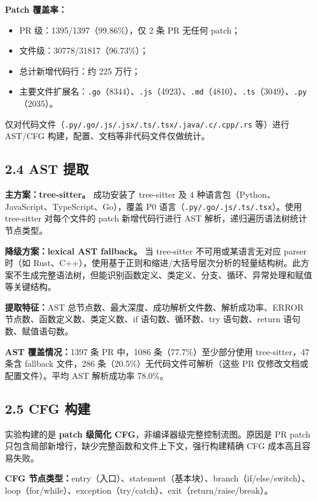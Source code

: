 \documentclass{experimentreport}
\begin{document}
{\textbf{Patch 覆盖率：}
\begin{itemize}
    \item PR 级：1395/1397（99.86\%），仅 2 条 PR 无任何 patch；
    \item 文件级：30778/31817（96.73\%）；
    \item 总计新增代码行：约 225 万行；
    \item 主要文件扩展名：\texttt{.go}（8344）、\texttt{.js}（4923）、\texttt{.md}（4810）、\texttt{.ts}（3049）、\texttt{.py}（2035）。
\end{itemize}

仅对代码文件（\texttt{.py/.go/.js/.jsx/.ts/.tsx/.java/.c/.cpp/.rs} 等）进行 AST/CFG 构建，配置、文档等非代码文件仅做统计。

\subsection*{2.4 AST 提取}

\textbf{主方案：tree-sitter。} 成功安装了 tree-sitter 及 4 种语言包（Python、JavaScript、TypeScript、Go），覆盖 P0 语言（\texttt{.py/.go/.js/.ts/.tsx}）。使用 tree-sitter 对每个文件的 patch 新增代码行进行 AST 解析，递归遍历语法树统计节点类型。

\textbf{降级方案：lexical AST fallback。} 当 tree-sitter 不可用或某语言无对应 parser 时（如 Rust、C++），使用基于正则和缩进/大括号层次分析的轻量结构树。此方案不生成完整语法树，但能识别函数定义、类定义、分支、循环、异常处理和赋值等关键结构。

\textbf{提取特征：}AST 总节点数、最大深度、成功解析文件数、解析成功率、ERROR 节点数、函数定义数、类定义数、if 语句数、循环数、try 语句数、return 语句数、赋值语句数。

\textbf{AST 覆盖情况：}1397 条 PR 中，1086 条（77.7\%）至少部分使用 tree-sitter，47 条含 fallback 文件，286 条（20.5\%）无代码文件可解析（这些 PR 仅修改文档或配置文件）。平均 AST 解析成功率 78.0\%。

\subsection*{2.5 CFG 构建}

实验构建的是 \textbf{patch 级简化 CFG}，非编译器级完整控制流图。原因是 PR patch 只包含局部新增行，缺少完整函数和文件上下文，强行构建精确 CFG 成本高且容易失败。

\textbf{CFG 节点类型：}entry（入口）、statement（基本块）、branch（if/else/switch）、loop（for/while）、exception（try/catch）、exit（return/raise/break）。

}
\end{document}

